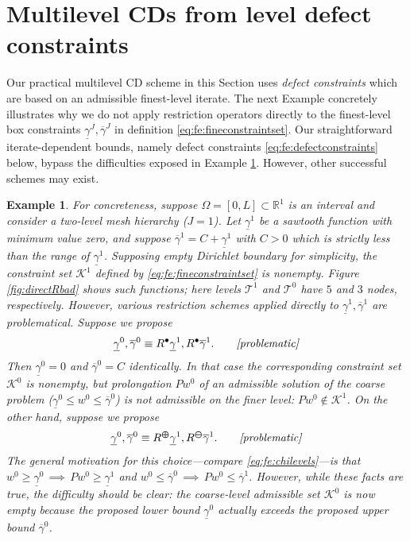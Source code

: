 \documentclass[letterpaper,final,12pt,reqno]{amsart}
\theoremstyle{cstyle}
\theoremstyle{cstyle*}
\theoremstyle{dstyle}
\newtheorem{example}[theorem]{Example}
\numberwithin{equation}{section}
\numberwithin{figure}{section}
\numberwithin{table}{section}
\numberwithin{theorem}{section}
\newcommand{\RR}{\mathbb{R}}
\newcommand{\maxR}{R^{\bm{\oplus}}}
\newcommand{\minR}{R^{\bm{\ominus}}}
\newcommand{\iR}{R^{\bullet}}
\begin{document}
\section{Multilevel CDs from level defect constraints} \label{sec:cdmultilevel}

Our practical multilevel CD scheme in this Section uses \emph{defect constraints} \cite{GraeserKornhuber2009} which are based on an admissible finest-level iterate.  The next Example concretely illustrates why we do not apply restriction operators directly to the finest-level box constraints $\underline{\gamma}^J,\overline{\gamma}^J$ in definition \eqref{eq:fe:fineconstraintset}.  Our straightforward iterate-dependent bounds, namely defect constraints \eqref{eq:fe:defectconstraints} below, bypass the difficulties exposed in Example \ref{ex:directRbad}.  However, other successful schemes may exist.

\begin{example}  \label{ex:directRbad}  
For concreteness, suppose $\Omega = [0,L] \subset \RR^1$ is an interval and consider a two-level mesh hierarchy ($J=1$).  Let $\underline{\gamma}^1$ be a sawtooth function with minimum value zero, and suppose $\overline{\gamma}^1=C+\underline{\gamma}^1$ with $C>0$ which is strictly less than the range of $\underline{\gamma}^1$.  Supposing empty Dirichlet boundary for simplicity, the constraint set $\mathcal{K}^1$ defined by \eqref{eq:fe:fineconstraintset} is nonempty.  Figure \ref{fig:directRbad} shows such functions; here levels $\mathcal{T}^1$ and $\mathcal{T}^0$ have $5$ and $3$ nodes, respectively.  However, various restriction schemes applied directly to $\underline{\gamma}^1,\overline{\gamma}^1$ are problematical.  Suppose we propose
    $$\underline{\gamma}^0, \overline{\gamma}^0 \equiv \iR \underline{\gamma}^1, \iR \overline{\gamma}^1. \qquad \text{\emph{[problematic]}}$$
Then $\underline{\gamma}^0=0$ and $\overline{\gamma}^0=C$ identically.  In that case the corresponding constraint set $\mathcal{K}^0$ is nonempty, but prolongation $Pw^0$ of an admissible solution of the coarse problem ($\underline{\gamma}^0 \le w^0 \le \overline{\gamma}^0$) is not admissible on the finer level: $Pw^0 \notin \mathcal{K}^1$.  On the other hand, suppose we propose
    $$\underline{\gamma}^0, \overline{\gamma}^0 \equiv \maxR \underline{\gamma}^1, \minR \overline{\gamma}^1. \qquad \text{\emph{[problematic]}}$$
The general motivation for this choice---compare \eqref{eq:fe:chilevels}---is that $w^0 \ge \underline{\gamma}^0 \, \implies \, Pw^0 \ge \underline{\gamma}^1$ and $w^0 \le \overline{\gamma}^0 \, \implies \, Pw^0 \le \overline{\gamma}^1$.  However, while these facts are true, the difficulty should be clear: the coarse-level admissible set $\mathcal{K}^0$ is now empty because the proposed lower bound $\underline{\gamma}^0$ actually exceeds the proposed upper bound $\overline{\gamma}^0$.
\end{example}
\end{document}
